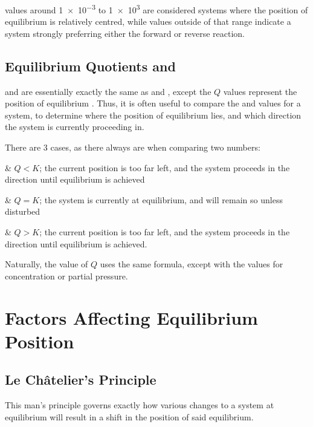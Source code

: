 			\Kc{} values around \num{1e-3} to \num{1e3} are considered systems where the position of equilibrium is relatively centred,
			while values outside of that range indicate a system strongly preferring either the forward or reverse reaction.



		\subsection{Equilibrium Quotients  and }

			\Qc{} and \Qp{} are essentially exactly the same as \Kc{} and \Kp{}, except the $Q$ values represent the position of equilibrium
			. Thus, it is often useful to compare the \Qc{} and \Kc{} values for a system, to determine
			where the  position of equilibrium lies, and which direction the system is currently proceeding in.

			There are 3 cases, as there always are when comparing two numbers:

			\begin{bulletlist}
				& $Q < K$; the current position is too far left, and the system proceeds in the  direction until equilibrium
				is achieved

				& $Q = K$; the system is currently at equilibrium, and will remain so unless disturbed

				& $Q > K$; the current position is too far left, and the system proceeds in the  direction until equilibrium
				is achieved.
			\end{bulletlist}

			Naturally, the value of $Q$ uses the same formula, except with the  values for concentration or partial
			pressure.





	\pagebreak
	\section{Factors Affecting Equilibrium Position}

		\subsection{Le Châtelier's Principle}

			This man's principle governs exactly how various changes to a system at equilibrium will result in a shift in the position of
			said equilibrium.


